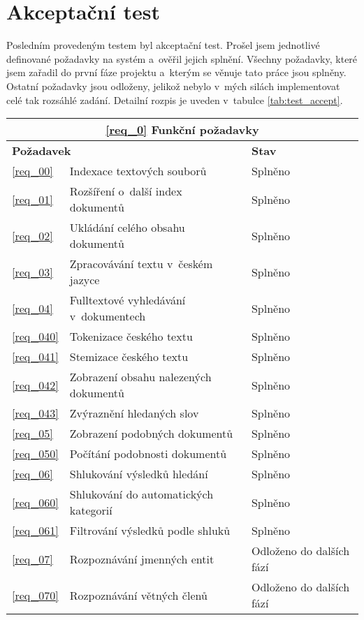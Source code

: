 \section{Akceptační test}
Posledním provedeným testem byl akceptační test. Prošel jsem jednotlivé definované požadavky na systém a~ověřil jejich splnění. Všechny požadavky, které jsem zařadil do první fáze projektu a~kterým se věnuje tato práce jsou splněny. Ostatní požadavky jsou odloženy, jelikož nebylo v~mých silách implementovat celé tak rozsáhlé zadání. Detailní rozpis je uveden v~tabulce \ref{tab:test_accept}.
\begin{table}
\begin{center}
\begin{tabular}{|l|l|l|}
\hline
\multicolumn{3}{|c|}{\textbf{\ref{req_0} Funkční požadavky}} \\ \hline
\multicolumn{2}{|l|}{\textbf{Požadavek}} & \textbf{Stav} \\ \hline
\ref{req_00} & Indexace textových souborů & Splněno\\ \hline 
\ref{req_01} & Rozšíření o~další index dokumentů & Splněno\\ \hline 
\ref{req_02} & Ukládání celého obsahu dokumentů & Splněno\\ \hline 
\ref{req_03} & Zpracovávání textu v~českém jazyce & Splněno\\ \hline 
\ref{req_04} & Fulltextové vyhledávání v~dokumentech & Splněno\\ \hline 
\ref{req_040} & Tokenizace českého textu & Splněno\\ \hline 
\ref{req_041} & Stemizace českého textu & Splněno\\ \hline 
\ref{req_042} & Zobrazení obsahu nalezených dokumentů & Splněno\\ \hline 
\ref{req_043} & Zvýraznění hledaných slov & Splněno\\ \hline 
\ref{req_05} & Zobrazení podobných dokumentů & Splněno\\ \hline 
\ref{req_050} & Počítání podobnosti dokumentů & Splněno\\ \hline 
\ref{req_06} & Shlukování výsledků hledání & Splněno\\ \hline 
\ref{req_060} & Shlukování do automatických kategorií & Splněno\\ \hline 
\ref{req_061} & Filtrování výsledků podle shluků & Splněno\\ \hline 
\ref{req_07} & Rozpoznávání jmenných entit & Odloženo do dalších fází\\ \hline 
\ref{req_070} & Rozpoznávání větných členů & Odloženo do dalších fází\\ \hline 

\end{tabular}
\end{center}
\end{table}
